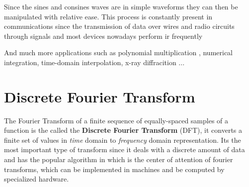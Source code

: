 \documentclass[
  oneside,
  11pt, a4paper,
  footinclude=true,
  headinclude=true,
  cleardoublepage=empty
]{scrbook}
\begin{document}
Since the sines and consines waves are in simple waveforms they can then be manipulated with relative ease. This process is constantly present in communications since the transmission of data over wires and radio circuits through signals and most devices nowadays perform ir frequently



And much more applications such as polynomial multiplication \cite{jia2014polynomial}, numerical integration, time-domain interpolation, x-ray diffracition ...

  



\section{Discrete Fourier Transform} \label{sec:discrete-fourier-transform}

The Fourier Transform of a finite sequence of equally-spaced samples of a function is the called the \textbf{Discrete Fourier Transform} (DFT), it converts a finite set of values in \textit{time} domain to \textit{frequency} domain representation. Its the most important type of transform since it deals with a discrete amount of data and has the popular algorithm in which is the center of attention of fourier transforms, which can be implemented in machines and be computed by specialized hardware.
\end{document}

